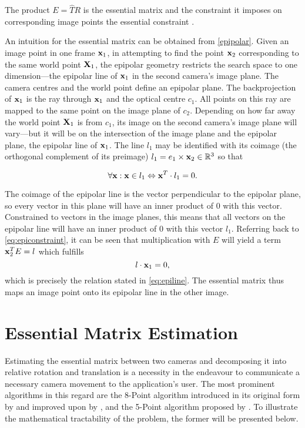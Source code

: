 The product $E=\widehat{T}R$ is the essential matrix and the constraint it
imposes on corresponding image points the essential constraint
\citep[see][chapter 5]{ma2003}. 

An intuition for the essential matrix can be
obtained from \autoref{epipolar}. Given an image point in one frame $\mathbf{x}_1$,
in attempting to find the point $\mathbf{x}_2$ corresponding to the same world
point $\mathbf{X}_1$, the epipolar geometry restricts the search space to one
dimension---the epipolar line of $\mathbf{x}_1$ in the second camera's image plane.
The camera centres and the world point define an epipolar plane. The
backprojection of $\mathbf{x}_1$ is the ray through $\mathbf{x}_1$ and the optical
centre $c_1$. All points on this ray are mapped to the same point on the image
plane of $c_2$. Depending on how far away the world point $\mathbf{X}_1$ is from $c_1$, its
image on the second camera's image plane will vary---but it will be on the
intersection of the image plane and the epipolar plane, the epipolar line of
$\mathbf{x}_1$. The line $l_1$ may be identified with its coimage (the orthogonal
complement of its preimage) $l_1 = e_1 \times \mathbf{x}_2 \in \mathbb{R}^3$ so that

\begin{equation} \label{eq:epiline}
   \forall\mathbf{x}: \mathbf{x}\in l_1 \Leftrightarrow \mathbf{x}^T\cdot l_1 = 0.
\end{equation} 

The coimage of the epipolar line is the vector perpendicular to the epipolar plane,
so every vector in this plane will have an inner product of $0$ with this
vector. Constrained to vectors in the image planes, this means that all vectors on the
epipolar line will have an inner product of $0$ with this vector $l_1$.
Referring back to \eqref{eq:epiconstraint}, it can be seen that multiplication
with $E$ will yield a term $\mathbf{x}_2^TE = l$ which fulfills 
\begin{equation}
   l \cdot \mathbf{x}_1 = 0,
\end{equation}
which is precisely the relation stated in \eqref{eq:epiline}. The essential
matrix thus maps an image point onto its epipolar line in the other image.

\section{Essential Matrix Estimation}

Estimating the essential matrix between two
cameras and decomposing it into relative rotation and translation is a necessity
in the endeavour to communicate a necessary camera movement to the application's
user. The most prominent algorithms in this regard are the 8-Point algorithm
introduced in its original form by \citet{longuet-higgins1987} and improved upon
by \citet{hartley1997}, and the 5-Point algorithm proposed by
\citet{nister2004}. To illustrate the mathematical tractability of the problem,
the former will be presented below.

